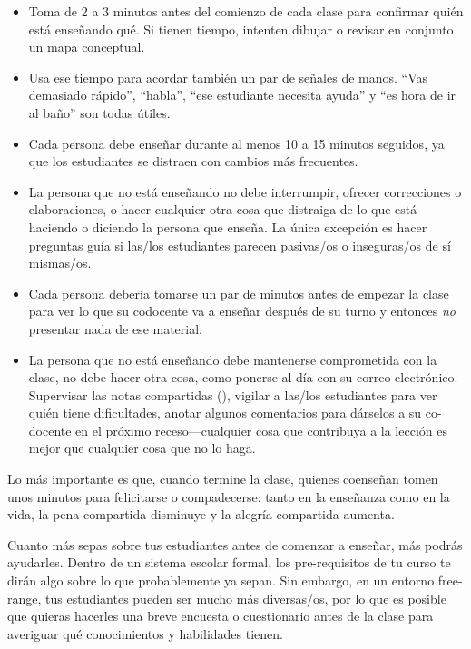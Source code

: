 \begin{itemize}

\item
  Toma de 2 a 3 minutos antes del comienzo de cada clase
  para confirmar quién está enseñando qué.
  Si tienen tiempo,
  intenten dibujar o revisar en conjunto un mapa conceptual.

\item
  Usa ese tiempo para acordar también un par de señales de manos.
  ``Vas demasiado rápido'',
  ``habla'',
  ``ese estudiante necesita ayuda''
  y ``es hora de ir al baño'' son todas útiles.

\item
  Cada persona debe enseñar durante al menos 10 a 15 minutos seguidos,
  ya que los estudiantes se distraen con cambios más frecuentes.

\item
  La persona que no está enseñando no debe interrumpir,
  ofrecer correcciones o elaboraciones,
  o hacer cualquier otra cosa que distraiga de lo que está haciendo o diciendo la persona que enseña.
  La única excepción es hacer preguntas guía
  si las/los estudiantes parecen pasivas/os o inseguras/os de sí mismas/os.
 
\item
  Cada persona debería tomarse un par de minutos antes de empezar la clase
  para ver lo que su co\-docente va a enseñar después de su turno
  y entonces \emph{no} presentar nada de ese material.

\item
  La persona que no está enseñando debe mantenerse comprometida con la clase,
  no debe hacer otra cosa, como ponerse al día con su correo electrónico.
  Supervisar las notas compartidas (),
  vigilar a las/los estudiantes para ver quién tiene dificultades,
  anotar algunos comentarios para dárselos a su co-docente en el próximo receso---cualquier
  cosa que contribuya a la lección es mejor que cualquier cosa que no lo haga.
 
\end{itemize}

Lo más importante es que,
cuando termine la clase, quienes co\-enseñan tomen unos minutos para felicitarse o compadecerse:
tanto en la enseñanza como en la vida,
la pena compartida disminuye y la alegría compartida aumenta.


Cuanto más sepas sobre tus estudiantes antes de comenzar a enseñar,
más podrás ayudarles.
Dentro de un sistema escolar formal,
los pre-requisitos de tu curso te dirán algo sobre
lo que probablemente ya sepan.
Sin embargo,
en un entorno free-range,
tus estudiantes pueden ser mucho más diversas/os,
por lo que es posible que quieras hacerles una breve encuesta o cuestionario antes de la clase
para averiguar qué conocimientos y habilidades tienen.

